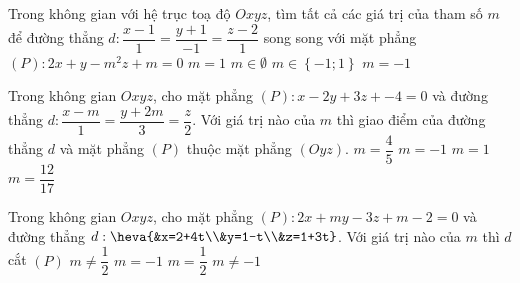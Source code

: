 \begin{ex}%
Trong không gian với hệ trục toạ độ $Oxyz$, tìm tất cả các giá trị của tham số $m$ để đường thẳng $d:\dfrac{x-1}{1}=\dfrac{y+1}{-1}=\dfrac{z-2}{1}$ song song với mặt phẳng $(P):2x+y-m^2z+m=0$
\choice
{$m=1$}
{$m\in\emptyset$}
{$m\in\left\{-1;1\right\}$}
{\True $m=-1$}
\end{ex}

\begin{ex}%
Trong không gian $Oxyz$, cho mặt phẳng $(P):x-2y+3z+-4=0$ và đường thẳng $d: \dfrac{x-m}{1}=\dfrac{y+2m}{3}=\dfrac{z}{2}$. Với giá trị nào của $m$ thì giao điểm của đường thẳng $d$ và mặt phẳng $(P)$ thuộc mặt phẳng $(Oyz)$.
\choice
{$m=\dfrac{4}{5}$}
{$m=-1$}
{\True $m=1$}
{$m=\dfrac{12}{17}$}
\end{ex}

\begin{ex}%
Trong không gian $Oxyz$, cho mặt phẳng $(P):2x+my-3z+m-2=0$ và đường thẳng $d:\heva{&x=2+4t\\&y=1-t\\&z=1+3t}$. Với giá trị nào của $m$ thì $d$ cắt $(P)$
\choice
{$m\neq\dfrac{1}{2}$}
{$m=-1$}
{$m=\dfrac{1}{2}$}
{\True $m\neq -1$}
\end{ex}

